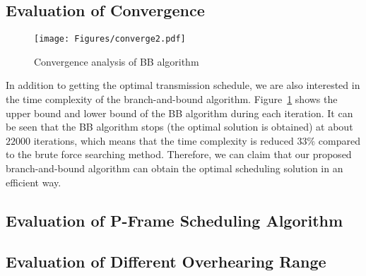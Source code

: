 \subsection{Evaluation of Convergence}
\begin{figure}
\begin{center}
\texttt{[image: Figures/converge2.pdf]}
\caption{\label{fig::evaBBConvergence}Convergence analysis of BB algorithm}
\end{center}
\end{figure}
In addition to getting the optimal transmission schedule, we are also interested in the time complexity of the branch-and-bound algorithm.
Figure~\ref{fig::evaBBConvergence} shows the upper bound and lower bound of the BB algorithm during each iteration.
It can be seen that the BB algorithm stops (the optimal solution is obtained) at about  $22000$ iterations, which means that the time complexity is reduced $33\%$ compared to the brute force searching method.
Therefore, we can claim that our proposed branch-and-bound algorithm can obtain the optimal scheduling solution in an efficient way.
%
\subsection{Evaluation of P-Frame Scheduling Algorithm}
%
\subsection{Evaluation of Different Overhearing Range}
